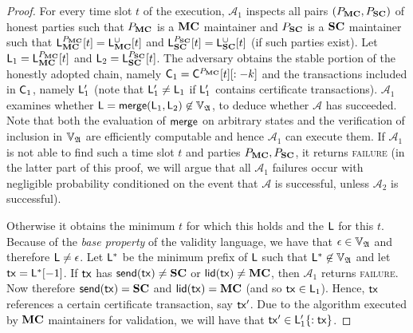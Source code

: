 \begin{proof}
  For every time slot $t$ of the execution, $\mathcal{A}_1$ inspects all pairs
  $(\party_\Mainchain, \party_\Sidechain)$ of honest parties such that $\party_\Mainchain$ is a $\Mainchain$
  maintainer and $\party_\Sidechain$ is a $\Sidechain$ maintainer such that
  $\LState_\Mainchain^{\party_\Mainchain}[t] = \LState_\Mainchain^\cup[t]$ and
  $\LState_\Sidechain^{\party_\Sidechain}[t] = \LState_\Sidechain^\cup[t]$ (if such parties exist).
  Let $\LState_1 = \LState_\Mainchain^{\party_\Mainchain}[t]$ and
  $\LState_2 = \LState_\Sidechain^{\party_\Sidechain}[t]$.
  The adversary obtains the stable portion of the
  honestly adopted chain, namely $\chain_1 = \LView{\chain}{\party_\Mainchain}{t}[:-k]$ and the
  transactions included in $\chain_1$, namely $\LState'_1$ (note that
  $\LState'_1 \neq \LState_1$ if $\LState'_1$ contains certificate
  transactions). $\mathcal{A}_1$ examines whether $\LState = \merge(\LState_1,
  \LState_2) \not\in\adalang$, to deduce whether $\mathcal{A}$ has succeeded.
  Note that both the evaluation of $\merge$ on arbitrary states and the
  verification of inclusion in $\adalang$ are efficiently computable and hence
  $\mathcal{A}_1$ can execute them. If $\mathcal{A}_1$ is not able to find such
  a time slot $t$ and parties $\party_\Mainchain, \party_\Sidechain$, it returns \textsc{failure}
  (in the latter part of this proof, we will argue that all $\mathcal{A}_1$
  failures occur with negligible probability conditioned on the event that
  $\mathcal{A}$ is successful, unless $\mathcal{A}_2$ is successful).

  Otherwise it obtains the minimum $t$ for which this holds and the $\LState$
  for this $t$. Because of the \emph{base property} of the validity language, we
  have that $\epsilon \in \adalang$ and therefore $\LState \neq \epsilon$. Let
  $\LState^*$ be the minimum prefix of $\LState$ such that $\LState^* \not\in
  \adalang$ and let $\tx = \LState^*[-1]$. If $\tx$ has $\send(\tx) \neq \Sidechain$ or
  $\llid(\tx) \neq \Mainchain$, then $\mathcal{A}_1$ returns \textsc{failure}. Now
  therefore $\send(\tx) = \Sidechain$ and $\llid(\tx) = \Mainchain$ (and so $\tx \in \LState_1$).
  Hence, $\tx$ references a certain certificate transaction, say $\tx'$. Due to
  the algorithm executed by $\Mainchain$ maintainers for validation, we will have that
  $\tx' \in \LState'_1\{:\tx\}$.


\end{proof}
